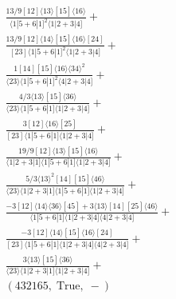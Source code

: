 \documentclass[varwidth, border=5pt]{standalone}
\begin{document}
\begin{my}
$\begin{gathered}
\scriptscriptstyle\frac{13/9[12]⟨13⟩[15]⟨16⟩}{⟨1|5+6|1]^2⟨1|2+3|4]}+\\
\scriptscriptstyle\frac{13/9[12]⟨14⟩[15]⟨16⟩[24]}{[23]⟨1|5+6|1]^2⟨1|2+3|4]}+\\
\scriptscriptstyle\frac{1[14][15]⟨16⟩⟨34⟩^2}{⟨23⟩⟨1|5+6|1]^2⟨4|2+3|4]}+\\
\scriptscriptstyle\frac{4/3⟨13⟩[15]⟨36⟩}{⟨23⟩⟨1|5+6|1]⟨1|2+3|4]}+\\
\scriptscriptstyle\frac{3[12]⟨16⟩[25]}{[23]⟨1|5+6|1]⟨1|2+3|4]}+\\
\scriptscriptstyle\frac{19/9[12]⟨13⟩[15]⟨16⟩}{⟨1|2+3|1]⟨1|5+6|1]⟨1|2+3|4]}+\\
\scriptscriptstyle\frac{5/3⟨13⟩^2[14][15]⟨46⟩}{⟨23⟩⟨1|2+3|1]⟨1|5+6|1]⟨1|2+3|4]}+\\
\scriptscriptstyle\frac{-3[12]⟨14⟩⟨36⟩[45]+3⟨13⟩[14][25]⟨46⟩}{⟨1|5+6|1]⟨1|2+3|4]⟨4|2+3|4]}+\\
\scriptscriptstyle\frac{-3[12]⟨14⟩[15]⟨16⟩[24]}{[23]⟨1|5+6|1]⟨1|2+3|4]⟨4|2+3|4]}+\\
\scriptscriptstyle\frac{3⟨13⟩[15]⟨36⟩}{⟨23⟩⟨1|2+3|1]⟨1|2+3|4]}+\\
\scriptscriptstyle(432165,\;\text{True},\;-)\phantom{+}
\end{gathered}$
\end{my}
\end{document}
